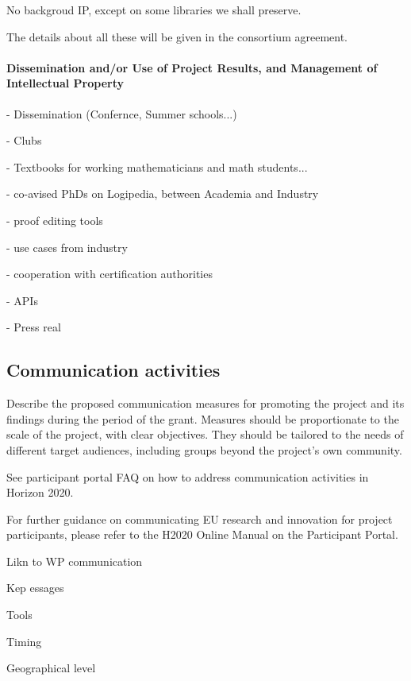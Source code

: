 No backgroud IP, except on some libraries
we shall preserve.

The details about all these will be given in the consortium agreement.
 







\paragraph*{Dissemination and/or Use of Project Results, and Management of Intellectual Property}\label{sec:dissemination}


- Dissemination  (Confernce, Summer schools...)

- Clubs

- Textbooks for working mathematicians and math students...

- co-avised PhDs on Logipedia, between Academia and Industry

- proof editing tools

- use cases from industry

- cooperation with certification authorities

- APIs

- Press real


\subsection{Communication activities}


\begin{todo}{}\color{red}
  Describe the proposed communication measures for promoting the project and its findings during the period of the grant. Measures should be proportionate to the scale of the project, with clear objectives.  They should be tailored to the needs of different target audiences, including groups beyond the project's own community.

  See participant portal FAQ on how to address communication activities in Horizon 2020.

  For further guidance on communicating EU research and innovation for project participants, please refer to the H2020 Online Manual on the Participant Portal.
\end{todo}

Likn to WP communication

Kep essages

Tools

Timing

Geographical level




